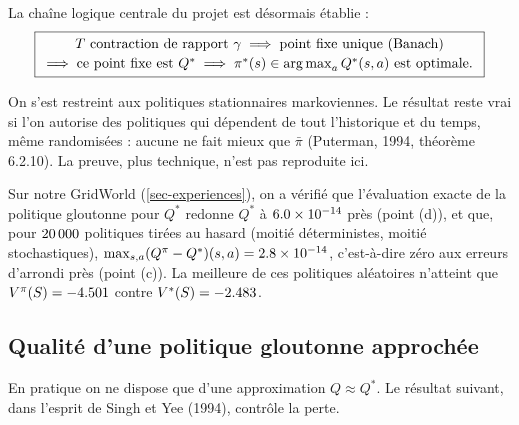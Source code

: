 La chaîne logique centrale du projet est désormais établie :
\[
\boxed{\begin{array}{c}
T\text{ contraction de rapport }\gamma\;\Longrightarrow\;\text{point fixe unique (Banach)}\\[2pt]
\Longrightarrow\;\text{ce point fixe est }Q^*\;\Longrightarrow\;\pi^*(s)\in\operatorname*{arg\,max}_aQ^*(s,a)\text{ est optimale.}
\end{array}}
\]

\begin{remarque}\label{rem-histoire}
On s'est restreint aux politiques stationnaires markoviennes. Le résultat reste vrai si l'on autorise des politiques qui dépendent de tout l'historique et du temps, même randomisées : aucune ne fait mieux que $\bar\pi$ (Puterman, 1994, théorème 6.2.10). La preuve, plus technique, n'est pas reproduite ici.
\end{remarque}

\begin{remarque}
Sur notre GridWorld (\cref{sec-experiences}), on a vérifié que l'évaluation exacte de la politique gloutonne pour $Q^*$ redonne $Q^*$ à $6.0\times10^{-14}$ près (point (d)), et que, pour $20\,000$ politiques tirées au hasard (moitié déterministes, moitié stochastiques), $\max_{s,a}(Q^\pi-Q^*)(s,a)=2.8\times10^{-14}$, c'est-à-dire zéro aux erreurs d'arrondi près (point (c)). La meilleure de ces politiques aléatoires n'atteint que $V^\pi(S)=-4.501$ contre $V^*(S)=-2.483$.
\end{remarque}

\subsection{Qualité d'une politique gloutonne approchée}

En pratique on ne dispose que d'une approximation $Q\approx Q^*$. Le résultat suivant, dans l'esprit de Singh et Yee (1994), contrôle la perte.

